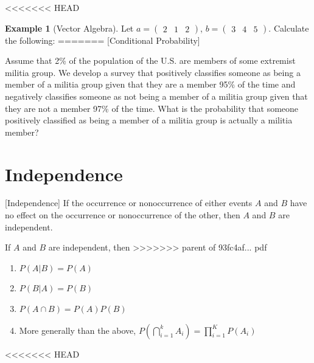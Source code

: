 \documentclass[]{book}
\providecommand{\tightlist}{%
  \setlength{\itemsep}{0pt}\setlength{\parskip}{0pt}}
\theoremstyle{definition}
\theoremstyle{definition}
\newtheorem{example}{Example}[chapter]
\theoremstyle{definition}
\theoremstyle{remark}
\begin{document}
<<<<<<< HEAD
\begin{example}[Vector Algebra]
\protect\hypertarget{exm:vectors}{}{\label{exm:vectors} {} }
Let \(a = \begin{pmatrix} 2&1&2\end{pmatrix}\), \(b = \begin{pmatrix} 3&4&5 \end{pmatrix}\). Calculate the following:
=======
[Conditional Probability]
\protect\hypertarget{exr:condprobexr}{}{\label{exr:condprobexr} {} }

Assume that 2\% of the population of the U.S. are members of some extremist militia group. We develop a survey that positively classifies someone as being a member of a militia group given that they are a member 95\% of the time and negatively classifies someone as not being a member of a militia group given that they are not a member 97\% of the time. What is the probability that someone positively classified as being a member of a militia group is actually a militia member?

\hypertarget{independence}{%
\section{Independence}\label{independence}}

[Independence]
\protect\hypertarget{def:unnamed-chunk-70}{}{\label{def:unnamed-chunk-70} {} } If the occurrence or nonoccurrence of either events \(A\) and \(B\) have no effect on the occurrence or nonoccurrence of the other, then \(A\) and \(B\) are independent.

If \(A\) and \(B\) are independent, then
>>>>>>> parent of 93fc4af... pdf

\begin{enumerate}
\def\labelenumi{\arabic{enumi}.}
\tightlist
\item
  \(P(A|B)=P(A)\)
\item
  \(P(B|A)=P(B)\)
\item
  \(P(A\cap B)=P(A)P(B)\)
\item
  More generally than the above, \(P(\bigcap_{i=1}^k A_i) = \prod_{i = 1}^K P(A_i)\)
\end{enumerate}
<<<<<<< HEAD
\end{example}
\end{document}
